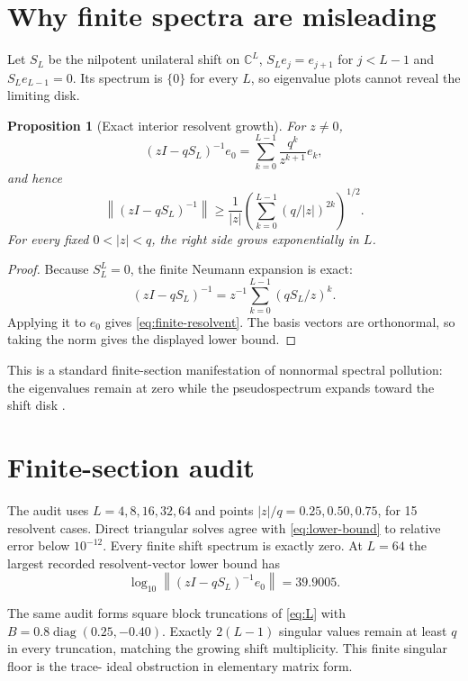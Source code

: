 \documentclass[12pt]{article}
\newtheorem{proposition}[theorem]{Proposition}
\theoremstyle{remark}
\newcommand{\norm}[1]{\left\lVert#1\right\rVert}
\begin{document}
\section{Why finite spectra are misleading}

Let $S_L$ be the nilpotent unilateral shift on $\mathbb C^L$,
$S_Le_j=e_{j+1}$ for $j<L-1$ and $S_Le_{L-1}=0$.  Its spectrum is
$\{0\}$ for every $L$, so eigenvalue plots cannot reveal the limiting disk.

\begin{proposition}[Exact interior resolvent growth]\label{prop:resolvent}
For $z\ne0$,
\begin{equation}\label{eq:finite-resolvent}
 (zI-qS_L)^{-1}e_0
 =\sum_{k=0}^{L-1}\frac{q^k}{z^{k+1}}e_k,
\end{equation}
and hence
\begin{equation}\label{eq:lower-bound}
 \norm{(zI-qS_L)^{-1}}
 \ge\frac1{|z|}
 \left(\sum_{k=0}^{L-1}(q/|z|)^{2k}\right)^{1/2}.
\end{equation}
For every fixed $0<|z|<q$, the right side grows exponentially in $L$.
\end{proposition}

\begin{proof}
Because $S_L^L=0$, the finite Neumann expansion is exact:
\[
 (zI-qS_L)^{-1}
 =z^{-1}\sum_{k=0}^{L-1}(qS_L/z)^k.
\]
Applying it to $e_0$ gives \eqref{eq:finite-resolvent}.  The basis vectors are
orthonormal, so taking the norm gives the displayed lower bound.
\end{proof}

This is a standard finite-section manifestation of nonnormal spectral
pollution: the eigenvalues remain at zero while the pseudospectrum expands
toward the shift disk \citep{TrefethenEmbree2005}.

\section{Finite-section audit}

The audit uses $L=4,8,16,32,64$ and points
$|z|/q=0.25,0.50,0.75$, for 15 resolvent cases.  Direct triangular solves
agree with \eqref{eq:lower-bound} to relative error below $10^{-12}$.  Every
finite shift spectrum is exactly zero.  At $L=64$ the largest recorded
resolvent-vector lower bound has
\[
 \log_{10}\norm{(zI-qS_L)^{-1}e_0}=39.9005.
\]

The same audit forms square block truncations of \eqref{eq:L} with
$B=0.8\operatorname{diag}(0.25,-0.40)$.  Exactly
$2(L-1)$ singular values remain at least $q$ in every truncation, matching
the growing shift multiplicity.  This finite singular floor is the trace-
ideal obstruction in elementary matrix form.
\end{document}
